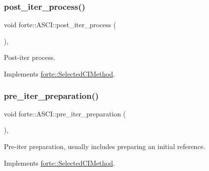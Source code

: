 \subsubsection{\texorpdfstring{post\+\_\+iter\+\_\+process()}{post\_iter\_process()}}
{\footnotesize\ttfamily void forte\+::\+A\+S\+C\+I\+::post\+\_\+iter\+\_\+process (\begin{DoxyParamCaption}{ }\end{DoxyParamCaption})\hspace{0.3cm}{\ttfamily [override]}, {\ttfamily [virtual]}}



Post-\/iter process. 



Implements \mbox{\hyperlink{classforte_1_1_selected_c_i_method_a23ea3389ac1c62dee811decc5bea507f}{forte\+::\+Selected\+C\+I\+Method}}.

\mbox{\label{classforte_1_1_a_s_c_i_aff9c84376007b8ef5a54d90c3e6a1c52}} 
\subsubsection{\texorpdfstring{pre\+\_\+iter\+\_\+preparation()}{pre\_iter\_preparation()}}
{\footnotesize\ttfamily void forte\+::\+A\+S\+C\+I\+::pre\+\_\+iter\+\_\+preparation (\begin{DoxyParamCaption}{ }\end{DoxyParamCaption})\hspace{0.3cm}{\ttfamily [override]}, {\ttfamily [virtual]}}



Pre-\/iter preparation, usually includes preparing an initial reference. 



Implements \mbox{\hyperlink{classforte_1_1_selected_c_i_method_af92b210415034874fcf2faac8b00eca9}{forte\+::\+Selected\+C\+I\+Method}}.

\mbox{\label{classforte_1_1_a_s_c_i_a59c39bbad1264f8daa3dadb0eeccdbd7}} 
